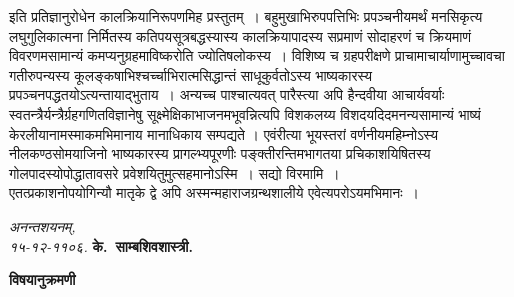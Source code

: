 \documentclass[11pt, openany]{book}
\begin{document}
\noindent इति प्रतिज्ञानुरोधेन कालक्रियानिरूपणमिह प्रस्तुतम्~। बहुमुखाभिरुपपत्तिभिः प्रपञ्चनीयमर्थं मनसिकृत्य लघुगुलिकात्मना निर्मितस्य
कतिपयसूत्रबद्धस्यास्य कालक्रियापादस्य सप्रमाणं सोदाहरणं च क्रियमाणं विवरणमसामान्यं कमप्यनुग्रहमाविष्करोति ज्योतिषलोकस्य~। विशिष्य च ग्रहपरीक्षणे प्राचामाचार्याणामुच्चावचा गतीरुपन्यस्य कूलङ्कषाभिश्चर्च्चाभिरात्मसिद्धान्तं साधूकुर्वतोऽस्य भाष्यकारस्य प्रपञ्चनपद्धतयोऽत्यन्तायाद्भुताय~। अन्यच्च \textendash पाश्चात्यवत् पारैस्त्या अपि हैन्दवीया आचार्यवर्याः स्वतन्त्रैर्यन्त्रैर्ग्रहगणितविज्ञानेषु सूक्ष्मेक्षिकाभाजनमभूवन्नित्यपि विशकलय्य विशदयदिदमनन्यसामान्यं भाष्यं केरलीयानामस्माकमभिमानाय मानाधिकाय सम्पद्यते । एवंरीत्या भूयस्तरां वर्णनीयमहिम्नोऽस्य नीलकण्ठसोमयाजिनो भाष्यकारस्य प्रागल्भ्यपूरणीः पङ्क्तीरन्तिमभागतया प्रचिकाशयिषितस्य गोलपादस्योपोद्धातावसरे प्रवेशयितुमुत्सहमानोऽस्मि~। सद्यो विरमामि~।\\

\noindent एतत्प्रकाशनोपयोगिन्यौ मातृके द्वे अपि अस्मन्महाराजग्रन्थशालीये एवेत्यपरोऽयमभिमानः~।

\hfill\break

\noindent \emph{अनन्तशयनम्,}\\
\noindent \emph{१५-१२-११०६.}\hspace{5.9cm}  \textbf{के.~साम्बशिवशास्त्री.}


\newpage
\thispagestyle{empty}

\begin{center}
	\textbf{विषयानुक्रमणी} \\
\end{center} 
\end{document}
